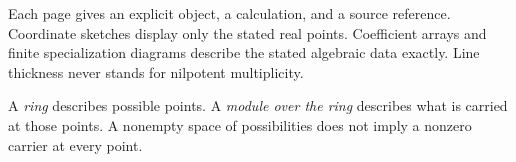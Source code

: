 Each page gives an explicit object, a calculation, and a source reference. Coordinate sketches display only the stated real points. Coefficient arrays and finite specialization diagrams describe the stated algebraic data exactly. Line thickness never stands for nilpotent multiplicity.


A \emph{ring} describes possible points. A \emph{module over the ring} describes what is carried at those points. A nonempty space of possibilities does not imply a nonzero carrier at every point.

